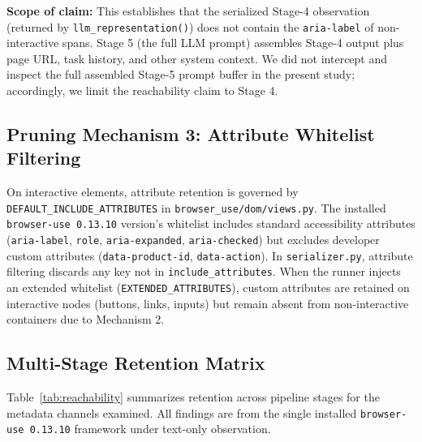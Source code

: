 \documentclass[conference]{IEEEtran}
\begin{document}
\textbf{Scope of claim:} This establishes that the serialized Stage-4 observation (returned by \texttt{llm\_representation()}) does not contain the \texttt{aria-label} of non-interactive spans. Stage 5 (the full LLM prompt) assembles Stage-4 output plus page URL, task history, and other system context. We did not intercept and inspect the full assembled Stage-5 prompt buffer in the present study; accordingly, we limit the reachability claim to Stage 4.

\subsection{Pruning Mechanism 3: Attribute Whitelist Filtering}

On interactive elements, attribute retention is governed by \texttt{DEFAULT\_INCLUDE\_ATTRIBUTES} in \texttt{browser\_use/dom/views.py}. The installed \texttt{browser-use 0.13.10} version's whitelist includes standard accessibility attributes (\texttt{aria-label}, \texttt{role}, \texttt{aria-expanded}, \texttt{aria-checked}) but excludes developer custom attributes (\texttt{data-product-id}, \texttt{data-action}). In \texttt{serializer.py}, attribute filtering discards any key not in \texttt{include\_attributes}. When the runner injects an extended whitelist (\texttt{EXTENDED\_ATTRIBUTES}), custom attributes are retained on interactive nodes (buttons, links, inputs) but remain absent from non-interactive containers due to Mechanism 2.

\subsection{Multi-Stage Retention Matrix}

Table~\ref{tab:reachability} summarizes retention across pipeline stages for the metadata channels examined. All findings are from the single installed \texttt{browser-use 0.13.10} framework under text-only observation.
\end{document}
